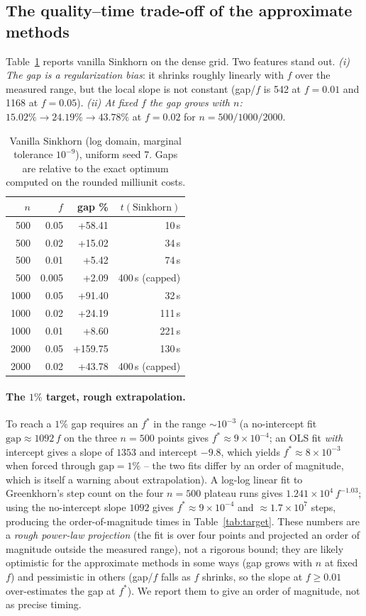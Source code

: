 \documentclass[11pt]{article}
\theoremstyle{remark}
\begin{document}
\subsection{The quality--time trade-off of the approximate methods}
Table~\ref{tab:approx} reports vanilla Sinkhorn on the dense grid. Two
features stand out. \emph{(i) The gap is a regularization bias}: it
shrinks roughly linearly with $f$ over the measured range, but the local
slope is not constant (gap/$f$ is 542 at $f=0.01$ and 1168 at $f=0.05$).
\emph{(ii) At fixed $f$ the gap \emph{grows} with $n$:}
$15.02\%\to 24.19\%\to 43.78\%$ at $f=0.02$ for $n=500/1000/2000$.

\begin{table}[t]
\centering
\begin{tabular}{rrrr}
\toprule
$n$ & $f$ & gap \% & $t(\mathrm{Sinkhorn})$ \\
\midrule
500  & 0.05 & +58.41  & 10\,s  \\
500  & 0.02 & +15.02  & 34\,s  \\
500  & 0.01 & +5.42   & 74\,s  \\
500  & 0.005 & +2.09 & 400\,s (capped) \\
1000 & 0.05 & +91.40  & 32\,s  \\
1000 & 0.02 & +24.19  & 111\,s \\
1000 & 0.01 & +8.60   & 221\,s \\
2000 & 0.05 & +159.75 & 130\,s \\
2000 & 0.02 & +43.78  & 400\,s (capped) \\
\bottomrule
\end{tabular}
\caption{Vanilla Sinkhorn (log domain, marginal tolerance $10^{-9}$),
uniform seed 7. Gaps are relative to the exact optimum computed on the
rounded milliunit costs.}
\label{tab:approx}
\end{table}

\paragraph{The $1\%$ target, rough extrapolation.}
To reach a $1\%$ gap requires an $f^*$ in the range $\sim 10^{-3}$ (a
no-intercept fit $\mathrm{gap} \approx 1092\,f$ on the three $n=500$ points gives
$f^*\approx 9\times 10^{-4}$; an OLS fit \emph{with} intercept gives a
slope of $1353$ and intercept $-9.8$, which yields $f^*\approx 8\times 10^{-3}$
when forced through $\mathrm{gap}=1\%$ -- the two fits differ by an order of
magnitude, which is itself a warning about extrapolation). A log-log linear
fit to Greenkhorn's step count on the four $n=500$ plateau runs gives
$1.241\times 10^4\,f^{-1.03}$; using the no-intercept slope $1092$ gives
$f^*\approx 9\times 10^{-4}$ and $\approx 1.7\times 10^7$ steps,
producing the order-of-magnitude times in Table~\ref{tab:target}. These
numbers are a \emph{rough power-law projection} (the fit is over four
points and projected an order of magnitude outside the measured range),
not a rigorous bound; they are likely optimistic for the approximate
methods in some ways (gap grows with $n$ at fixed $f$) and pessimistic in
others (gap/$f$ falls as $f$ shrinks, so the slope at $f\ge 0.01$
over-estimates the gap at $f^*$). We report them to give an order of
magnitude, not as precise timing.
\end{document}
